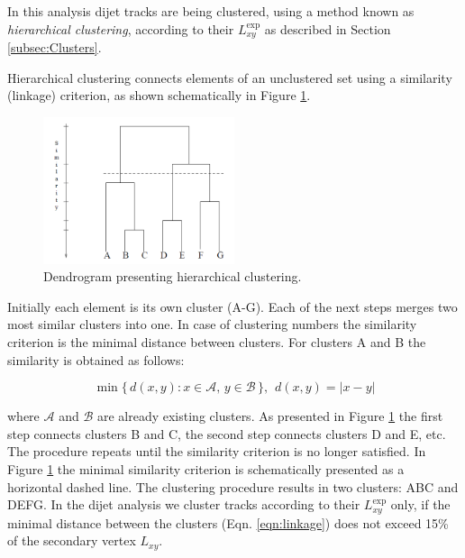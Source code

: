 
In this analysis dijet tracks are being clustered, using a method known as {\it hierarchical clustering}, according to 
their $L_{xy}^\text{exp}$ as described in Section \ref{subsec:Clusters}.

Hierarchical clustering connects elements of an unclustered set using a similarity (linkage) criterion,
as shown schematically in Figure \ref{fig:dendrogram}.
\begin{figure}[htbp]
\centering
\includegraphics[width=0.5\textwidth]{plots/dendrogram2.png}
\caption{Dendrogram presenting hierarchical clustering. \label{fig:dendrogram}}
\end{figure}

 Initially each element is its own cluster (A-G). Each of the next steps merges 
 two most similar clusters into one.
In case of clustering numbers the similarity criterion is the minimal distance 
between clusters. For clusters A and B the similarity is obtained as follows:

\begin{equation}
\min \{\, d(x,y) : x \in \mathcal{A},\, y \in \mathcal{B} \,\}, \hspace{5pt} d(x,y)=|x-y| 
\label{eqn:linkage}
\end{equation}

where $\mathcal{A}$ and $\mathcal{B}$ are already existing clusters.
 As presented in Figure \ref{fig:dendrogram} the first step connects clusters B and C, the second step connects clusters D and E, etc.
The procedure repeats until the similarity criterion is no longer satisfied. In Figure \ref{fig:dendrogram} the minimal similarity criterion is 
schematically presented as a horizontal
dashed line. The clustering procedure results in two clusters: ABC and DEFG. In the dijet analysis we cluster tracks according to 
their $L_{xy}^\text{exp}$ only, if the minimal distance between the clusters (Eqn. \ref{eqn:linkage}) does not exceed 15\% of the secondary vertex $L_{xy}$.

